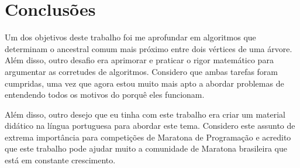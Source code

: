 \chapter{Conclusões}
\label{cap:conclusoes}

Um dos objetivos deste trabalho foi me aprofundar em algoritmos que determinam o ancestral comum mais próximo entre dois vértices de uma árvore. Além disso, outro desafio era aprimorar e praticar o rigor matemático para argumentar as corretudes de algoritmos. Considero que ambas tarefas foram cumpridas, uma vez que agora estou muito mais apto a abordar problemas de \LCA\, entendendo todos os motivos do porquê eles funcionam.

Além disso, outro desejo que eu tinha com este trabalho era criar um material didático na língua portuguesa para abordar este tema. Considero este assunto de extrema importância para competições de Maratona de Programação e acredito que este trabalho pode ajudar muito a comunidade de Maratona brasileira que está em constante crescimento.